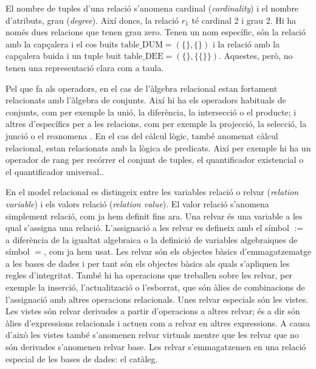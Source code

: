 El nombre de tuples d'una relació s'anomena cardinal
(\emph{cardinality}) i el nombre d'atributs, grau
(\emph{degree}). Així doncs, la relació $r_1$ té cardinal 2 i grau 2.
Hi ha només dues relacions que tenen grau zero. Tenen un nom
específic, són la relació amb la capçalera i el cos buits
$\text{table\_DUM} = (\{\},\{\})$ i la relació amb la capçalera buida
i un tuple buit $\text{table\_DEE} = (\{\},\{\{\}\})$. Aquestes, però, no
tenen una representació clara com a taula.  



Pel que fa als operadors, en el cas de l'àlgebra relacional estan
fortament relacionats amb l'àlgebra de conjunts. Així hi ha els
operadors habituals de conjunts, com per exemple la unió, la
diferència, la intersecció o el producte; i altres d'específics per a
les relacions, com per exemple la projecció, la selecció, la junció o
el reanomena \parencite[\gls{capitol}~7]{date04:introduction8}.  En el cas del
càlcul lògic, també anomenat càlcul relacional, estan relacionats amb
la lògica de predicats. Així per exemple hi ha un operador de rang per
recórrer el conjunt de tuples, el quantificador existencial o el
quantificador universal.\parencite[cap.~8]{date04:introduction8}.



En el model relacional es distingeix entre les variables relació o
relvar (\emph{relation variable}) i els valors relació (\emph{relation
  value}). El valor relació s'anomena simplement relació, com ja hem
definit fins ara.  Una relvar és una variable a les qual s'assigna una
relació.  L'assignació a les relvar es defineix amb el símbol $:=$ a
diferència de la igualtat algebraica o la definició de variables
algebraiques de símbol $=$, com ja hem usat.  Les relvar són els
objectes bàsics d'emmagatzematge a les bases de dades i per tant són
els objectes bàsics als quals s'apliquen les regles
d'integritat. També hi ha operacions que treballen sobre les relvar,
per exemple la inserció, l'actualització o l'esborrat, que són àlies
de combinacions de l'assignació amb altres operacions relacionals.
Unes relvar especials són les vistes. Les vistes són relvar derivades
a partir d'operacions a altres relvar; és a dir són àlies
d'expressions relacionals i actuen com a relvar en altres
expressions. A causa d'això les vistes també s'anomenen relvar
virtuals mentre que les relvar que no són derivades s'anomenen relvar
base. Les relvar s'emmagatzemen en una relació especial de les bases
de dades: el catàleg.






